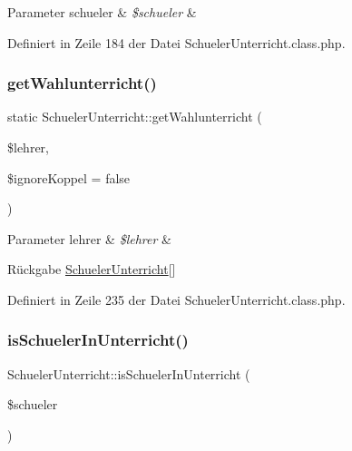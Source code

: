 \begin{DoxyParams}[1]{Parameter}
schueler & {\em \$schueler} & \\
\hline
\end{DoxyParams}


Definiert in Zeile 184 der Datei Schueler\+Unterricht.\+class.\+php.

\mbox{\label{class_schueler_unterricht_a92fb0cc62ae85aa88805ded1c635e691}} 
\subsubsection{\texorpdfstring{get\+Wahlunterricht()}{getWahlunterricht()}}
{\footnotesize\ttfamily static Schueler\+Unterricht\+::get\+Wahlunterricht (\begin{DoxyParamCaption}\item[{}]{\$lehrer,  }\item[{}]{\$ignore\+Koppel = {\ttfamily false} }\end{DoxyParamCaption})\hspace{0.3cm}{\ttfamily [static]}}


\begin{DoxyParams}[1]{Parameter}
lehrer & {\em \$lehrer} & \\
\hline
\end{DoxyParams}
\begin{DoxyReturn}{Rückgabe}
\mbox{\hyperlink{class_schueler_unterricht}{Schueler\+Unterricht}}\mbox{[}\mbox{]} 
\end{DoxyReturn}


Definiert in Zeile 235 der Datei Schueler\+Unterricht.\+class.\+php.

\mbox{\label{class_schueler_unterricht_ada7eeec8566c83f7b4b2a401b53733e6}} 
\subsubsection{\texorpdfstring{is\+Schueler\+In\+Unterricht()}{isSchuelerInUnterricht()}}
{\footnotesize\ttfamily Schueler\+Unterricht\+::is\+Schueler\+In\+Unterricht (\begin{DoxyParamCaption}\item[{}]{\$schueler }\end{DoxyParamCaption})}


